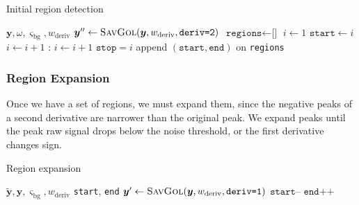 \documentclass{article}
\begin{document}
\begin{algorithm}[t]
\caption{Initial region detection}\label{alg:regdetect}
\begin{algorithmic}
\Require $\bm{y}, \omega, \varsigma_{\text{bg}}, w_{\text{deriv}}$
\State $\bm{y}^{\prime\prime} \gets \textsc{SavGol}(\bm{y}, w_{\text{deriv}}, \texttt{deriv=2})$ 
\State $\texttt{regions} \gets \texttt{[]}$
\State $i \gets 1$
    \State $\texttt{start} \gets i$
    \State $i \gets i+1$
    :
      \State $i \gets i+1$
    \EndWhile
    \State $\texttt{stop} = i$
  	  \State append $(\texttt{start}, \texttt{end})$ on \texttt{regions}
    \EndIf
  \EndIf
\EndWhile
\end{algorithmic}
\end{algorithm}



\subsubsection{Region Expansion}

Once we have a set of regions, we must expand them, since the negative peaks of a second derivative are narrower than the original peak. We expand peaks until the peak raw signal drops below the noise threshold, or the first derivative changes sign. 



\begin{algorithm}[t]
\caption{Region expansion}\label{alg:regexp}
\begin{algorithmic}
\Require $\bm{\tilde{y}},\bm{y}, \varsigma_{\text{bg}}, w_{\text{deriv}}$
\Require \texttt{start}, \texttt{end} 
\State $\bm{y}^\prime \gets \textsc{SavGol}(\bm{y}, w_{\text{deriv}}, \texttt{deriv=1})$
\State $ \texttt{start--}$
\EndWhile
{}
\State $ \texttt{end++}$
\EndWhile
\end{algorithmic}
\end{algorithm}
\end{document}
